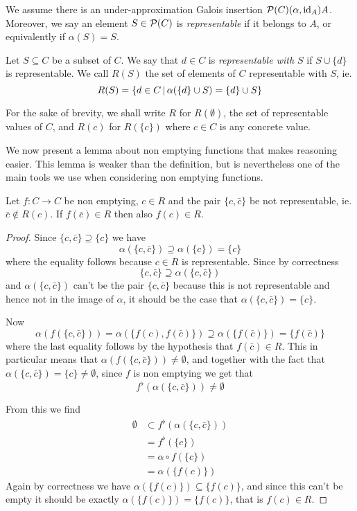 We assume there is an under-approximation Galois insertion $\mathcal{P}(C) (\alpha, \text{id}_A) A$. Moreover, we say an element $S \in \mathcal{P}(C)$ is \textit{representable} if it belongs to $A$, or equivalently if $\alpha(S) = S$.

\begin{definition}\label{ch3:def:repr-with-set}
	Let $S \subseteq C$ be a subset of $C$. We say that $d \in C$ is \textit{representable with $S$} if $S \cup \{ d \}$ is representable. We call $R(S)$ the set of elements of $C$ representable with $S$, ie.
	\[
	R(S) = \{ d \in C \,\vert\, \alpha(\{ d \} \cup S) = \{ d \} \cup S \}
	\]
\end{definition}
For the sake of brevity, we shall write $R$ for $R(\emptyset)$, the set of representable values of $C$, and $R(c)$ for $R(\{ c \})$ where $c \in C$ is any concrete value.

We now present a lemma about non emptying functions that makes reasoning easier. This lemma is weaker than the definition, but is nevertheless one of the main tools we use when considering non emptying functions.

\begin{lemma}\label{ch3:th:f-non-repr-pair}
	Let $f: C \rightarrow C$ be non emptying, $c \in R$ and the pair $\{ c, \bar{c} \}$ be not representable, ie. $\bar{c} \notin R(c)$. If $f(\bar{c}) \in R$ then also $f(c) \in R$.
\end{lemma}
\begin{proof}
	Since $\{ c, \bar{c} \} \supseteq \{ c \}$ we have
	\[
	\alpha(\{ c, \bar{c} \}) \supseteq \alpha(\{ c \}) = \{ c \}
	\]
	where the equality follows because $c \in R$ is representable. Since by correctness
	\[
	\{ c, \bar{c} \} \supseteq \alpha(\{ c, \bar{c} \})
	\]
	and $\alpha(\{ c, \bar{c} \})$ can't be the pair $\{ c, \bar{c} \}$ because this is not representable and hence not in the image of $\alpha$, it should be the case that $\alpha(\{ c, \bar{c} \}) = \{ c \}$.

	Now
	\[
	\alpha(f(\{ c, \bar{c} \})) = \alpha(\{ f(c), f(\bar{c}) \}) \supseteq \alpha(\{ f(\bar{c}) \}) = \{ f(\bar{c}) \}
	\]
	where the last equality follows by the hypothesis that $f(\bar{c}) \in R$.
	This in particular means that $\alpha(f(\{ c, \bar{c} \})) \neq \emptyset$, and together with the fact that $\alpha(\{ c, \bar{c} \}) = \{ c \} \neq \emptyset$, since $f$ is non emptying we get that
	\[
	f^{\flat}(\alpha(\{ c, \bar{c} \})) \neq \emptyset
	\]

	From this we find
	\begin{align*}
		\emptyset &\subset f^{\flat}(\alpha(\{ c, \bar{c} \})) \\
		&= f^{\flat}(\{ c \}) \\
		&= \alpha \circ f(\{ c \}) \\
		&= \alpha(\{ f(c) \})
	\end{align*}
	Again by correctness we have $\alpha(\{ f(c) \}) \subseteq \{ f(c)\}$, and since this can't be empty it should be exactly $\alpha(\{ f(c) \}) = \{ f(c) \}$, that is $f(c) \in R$.
\end{proof}

